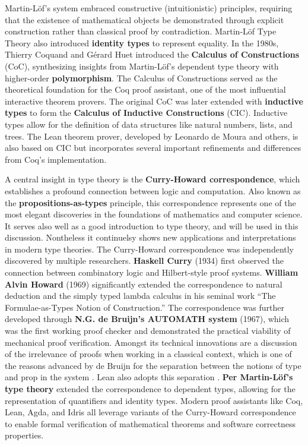 Martin-L\"{o}f's system embraced constructive (intuitionistic) principles, requiring that the existence of mathematical 
objects be demonstrated through explicit construction rather than classical proof by contradiction. 
Martin-L\"{o}f Type Theory also introduced \textbf{identity types} to represent equality.
In the 1980s, Thierry Coquand and G\'{e}rard Huet introduced the \textbf{Calculus of Constructions} (CoC), 
synthesizing insights from Martin-L\"{o}f's dependent type theory with higher-order \textbf{polymorphism}. 
The Calculus of Constructions served as the theoretical foundation for the Coq proof assistant, 
one of the most influential interactive theorem provers.
The original CoC was later extended with \textbf{inductive types} to form the 
\textbf{Calculus of Inductive Constructions} (CIC). Inductive types allow for the definition 
of data structures like natural numbers, lists, and trees. 
The Lean theorem prover, developed by Leonardo de Moura and others, is also based on CIC 
but incorporates several important refinements and differences from Coq's implementation. 

A central insight in type theory is the \textbf{Curry-Howard correspondence}, 
which establishes a profound connection between logic and computation. 
Also known as the \textbf{propositions-as-types} principle, this correspondence 
represents one of the most elegant discoveries in the foundations 
of mathematics and computer science.
It serves also well as a good introduction to type theory, and will be used in this discussion.
Nontheless it continuelsy shows new applications and interpretations in modern type theories.
The Curry-Howard correspondence was independently discovered by multiple researchers.
\textbf{Haskell Curry} (1934) first observed the connection between combinatory logic and 
Hilbert-style proof systems.
\textbf{William Alvin Howard} (1969) significantly extended the correspondence to natural deduction 
and the simply typed lambda calculus in his seminal work ``The Formulae-as-Types Notion of Construction.'' 
The correspondence was further developed through \textbf{N.G. de Bruijn's AUTOMATH system} (1967), 
which was the first working proof checker and demonstrated the practical viability of mechanical 
proof verification. Amongst its technical innovations are a discussion of the
irrelevance of proofs when working in a classical context, which is one
of the reasons advanced by de Bruijn for the separation between the notions of 
type and prop in the system \cite{thompson1999types}. Lean also adopts this separation .
\textbf{Per Martin-L\"{o}f's type theory} extended the correspondence to
dependent types, allowing for the representation of quantifiers and identity types.
Modern proof assistants like Coq, Lean, Agda, and Idris all leverage 
variants of the Curry-Howard correspondence to enable formal verification of mathematical theorems 
and software correctness properties.

